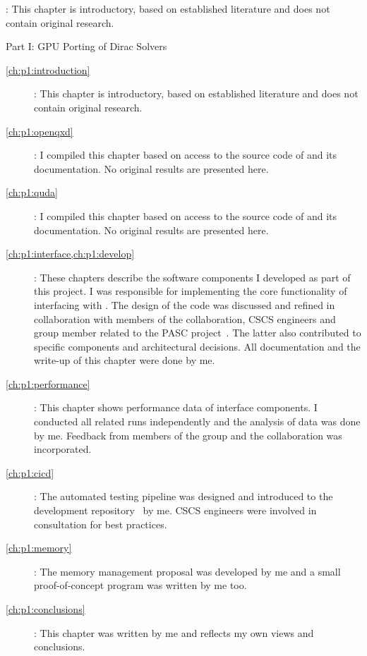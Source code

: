 \begin{description}
\item[\cref{ch:introduction}]: This chapter is introductory, based on established literature and does not contain original research.
\item Part I: GPU Porting of Dirac Solvers
   \begin{description}
   \item[\cref{ch:p1:introduction}]: This chapter is introductory, based on established literature and does not contain original research.
   \item[\cref{ch:p1:openqxd}]: I compiled this chapter based on access to the source code of \openqxd and its documentation. No original results are presented here.
   \item[\cref{ch:p1:quda}]: I compiled this chapter based on access to the source code of \quda and its documentation. No original results are presented here.
   \item[\cref{ch:p1:interface,ch:p1:develop}]: These chapters describe the software components I developed as part of this project. I was responsible for implementing the core functionality of interfacing \openqxd with \quda. The design of the code was discussed and refined in collaboration with members of the \RCstar collaboration, CSCS engineers and group member related to the PASC project~\cite{online:pasc2025}. The latter also contributed to specific components and architectural decisions. All documentation and the write-up of this chapter were done by me.
   \item[\cref{ch:p1:performance}]: This chapter shows performance data of interface components. I conducted all related runs independently and the analysis of data was done by me. Feedback from members of the group and the \RCstar collaboration was incorporated.
   \item[\cref{ch:p1:cicd}]: The automated testing pipeline was designed and introduced to the development repository~\cite{gitlab:openqxd-devel} by me. CSCS engineers were involved in consultation for best practices.
   \item[\cref{ch:p1:memory}]: The memory management proposal was developed by me and a small proof-of-concept program was written by me too.
   \item[\cref{ch:p1:conclusions}]: This chapter was written by me and reflects my own views and conclusions.
   \end{description}

\end{description}
